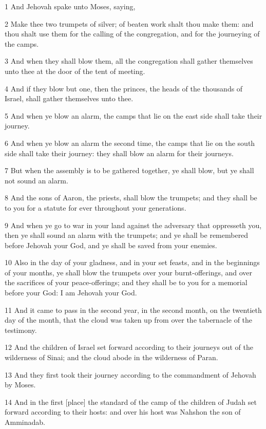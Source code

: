 \par 1 And Jehovah spake unto Moses, saying,
\par 2 Make thee two trumpets of silver; of beaten work shalt thou make them: and thou shalt use them for the calling of the congregation, and for the journeying of the camps.
\par 3 And when they shall blow them, all the congregation shall gather themselves unto thee at the door of the tent of meeting.
\par 4 And if they blow but one, then the princes, the heads of the thousands of Israel, shall gather themselves unto thee.
\par 5 And when ye blow an alarm, the camps that lie on the east side shall take their journey.
\par 6 And when ye blow an alarm the second time, the camps that lie on the south side shall take their journey: they shall blow an alarm for their journeys.
\par 7 But when the assembly is to be gathered together, ye shall blow, but ye shall not sound an alarm.
\par 8 And the sons of Aaron, the priests, shall blow the trumpets; and they shall be to you for a statute for ever throughout your generations.
\par 9 And when ye go to war in your land against the adversary that oppresseth you, then ye shall sound an alarm with the trumpets; and ye shall be remembered before Jehovah your God, and ye shall be saved from your enemies.
\par 10 Also in the day of your gladness, and in your set feasts, and in the beginnings of your months, ye shall blow the trumpets over your burnt-offerings, and over the sacrifices of your peace-offerings; and they shall be to you for a memorial before your God: I am Jehovah your God.
\par 11 And it came to pass in the second year, in the second month, on the twentieth day of the month, that the cloud was taken up from over the tabernacle of the testimony.
\par 12 And the children of Israel set forward according to their journeys out of the wilderness of Sinai; and the cloud abode in the wilderness of Paran.
\par 13 And they first took their journey according to the commandment of Jehovah by Moses.
\par 14 And in the first [place] the standard of the camp of the children of Judah set forward according to their hosts: and over his host was Nahshon the son of Amminadab.
